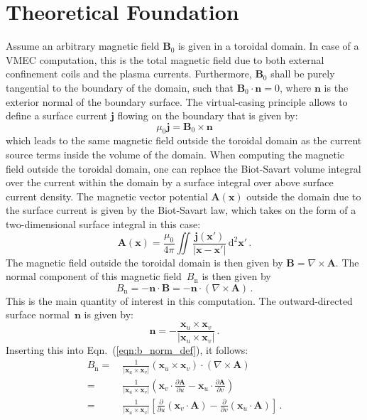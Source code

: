 \section{Theoretical Foundation}
Assume an arbitrary magnetic field $\mathbf{B}_0$ is given in a toroidal domain.
In case of a VMEC computation, this is the total magnetic field
due to both external confinement coils and the plasma currents.
Furthermore, $\mathbf{B}_0$ shall be purely tangential to the boundary of the domain,
such that $\mathbf{B}_0 \cdot \mathbf{n} = 0$, where $\mathbf{n}$ is the exterior normal of the boundary surface.
The virtual-casing principle allows to define a surface current $\mathbf{j}$ flowing on the boundary
that is given by:
\begin{equation}
  \mu_0 \mathbf{j} = \mathbf{B}_0 \times \mathbf{n}
\end{equation}
which leads to the same magnetic field outside the toroidal domain
as the current source terms inside the volume of the domain.
When computing the magnetic field outside the toroidal domain,
one can replace the Biot-Savart volume integral over the current within the domain
by a surface integral over above surface current density.
The magnetic vector potential $\mathbf{A}(\mathbf{x})$ outside the domain
due to the surface current is given by the Biot-Savart law,
which takes on the form of a two-dimensional surface integral in this case:
\begin{equation}
 \mathbf{A}(\mathbf{x}) = \frac{\mu_0}{4 \pi} \iint \frac{\mathbf{j}(\mathbf{x}')}{|\mathbf{x} - \mathbf{x}'|} \,\mathrm{d}^2\mathbf{x}' \, .
\end{equation}
The magnetic field outside the toroidal domain
is then given by $\mathbf{B} = \nabla \times \mathbf{A}$.
The normal component of this magnetic field~$B_\mathrm{n}$ is then given by
\begin{equation}
 B_\mathrm{n} = -\mathbf{n} \cdot \mathbf{B} = -\mathbf{n} \cdot (\nabla \times \mathbf{A}) \label{eqn:b_norm_def} \, .
\end{equation}
This is the main quantity of interest in this computation.
The outward-directed surface normal~$\mathbf{n}$ is given by:
\begin{equation}
 \mathbf{n} = - \frac{\mathbf{x}_u \times \mathbf{x}_v}{|\mathbf{x}_u \times \mathbf{x}_v|} \, .
\end{equation}
Inserting this into Eqn.~(\ref{eqn:b_norm_def}), it follows:
\begin{align}
 B_\mathrm{n}
 =&\ \frac{1}{|\mathbf{x}_u \times \mathbf{x}_v|}
     \left( \mathbf{x}_u \times \mathbf{x}_v \right) \cdot (\nabla \times \mathbf{A}) \nonumber \\
 =&\ \frac{1}{|\mathbf{x}_u \times \mathbf{x}_v|}
     \left(  \mathbf{x}_v \cdot \frac{\partial \mathbf{A}}{\partial u}
           - \mathbf{x}_u \cdot \frac{\partial \mathbf{A}}{\partial v} \right) \nonumber \\
 =&\ \frac{1}{|\mathbf{x}_u \times \mathbf{x}_v|}
     \left[  \frac{\partial}{\partial u} \left(\mathbf{x}_v \cdot \mathbf{A} \right)
           - \frac{\partial}{\partial v} \left(\mathbf{x}_u \cdot \mathbf{A} \right) \right] \, .
\end{align}
